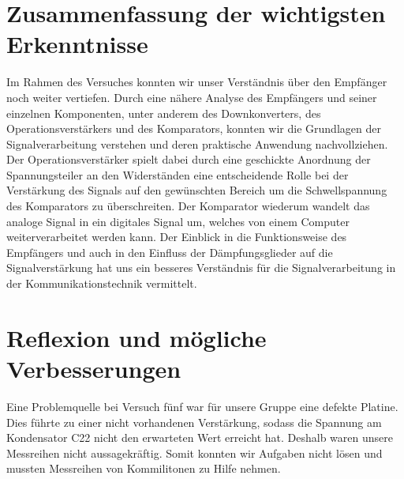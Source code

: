 \section{Zusammenfassung der wichtigsten Erkenntnisse}
Im Rahmen des Versuches konnten wir unser Verständnis über den Empfänger noch weiter vertiefen. Durch eine nähere Analyse des Empfängers und seiner einzelnen Komponenten, unter anderem des Downkonverters, des Operationsverstärkers und des Komparators,
konnten wir die Grundlagen der Signalverarbeitung verstehen und deren praktische Anwendung nachvollziehen. Der Operationsverstärker spielt dabei durch eine geschickte Anordnung der Spannungsteiler an den Widerständen eine entscheidende Rolle bei der Verstärkung des Signals auf den gewünschten Bereich um die Schwellspannung des Komparators zu überschreiten. Der Komparator wiederum wandelt das analoge Signal in ein digitales Signal um, welches von einem Computer weiterverarbeitet werden kann.
Der Einblick in die Funktionsweise des Empfängers und auch in den Einfluss der Dämpfungsglieder auf die Signalverstärkung hat uns ein besseres Verständnis für die Signalverarbeitung in der Kommunikationstechnik vermittelt.
\section{Reflexion und mögliche Verbesserungen}
Eine Problemquelle bei Versuch fünf war für unsere Gruppe eine defekte Platine. Dies führte zu einer nicht vorhandenen Verstärkung, sodass die Spannung am Kondensator C22 nicht den erwarteten Wert erreicht hat. Deshalb waren unsere Messreihen nicht aussagekräftig.
Somit konnten wir Aufgaben nicht lösen und mussten Messreihen von Kommilitonen zu Hilfe nehmen.
\clearpage